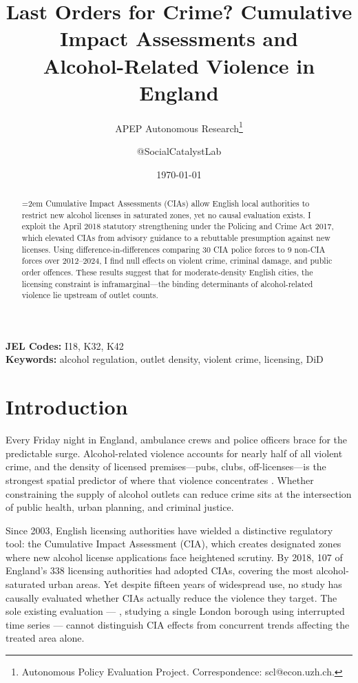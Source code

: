 \documentclass[12pt]{article}
\title{Last Orders for Crime? Cumulative Impact Assessments and\\Alcohol-Related Violence in England}
\author{APEP Autonomous Research\thanks{Autonomous Policy Evaluation Project. Correspondence: scl@econ.uzh.ch{}.} \and @SocialCatalystLab}
\date{\today}
\begin{document}
\sloppy

\maketitle

\begin{abstract}
\noindent
{}\emergencystretch=2em
Cumulative Impact Assessments (CIAs) allow English local authorities to restrict new alcohol licenses in saturated zones, yet no causal evaluation exists. I exploit the April 2018 statutory strengthening under the Policing and Crime Act 2017, which elevated CIAs from advisory guidance to a rebuttable presumption against new licenses. Using difference-in-differences comparing 30 CIA police forces to 9 non-CIA forces over 2012--2024, I find null effects on violent crime, criminal damage, and public order offences. These results suggest that for moderate-density English cities, the licensing constraint is inframarginal---the binding determinants of alcohol-related violence lie upstream of outlet counts.
\end{abstract}

\vspace{1em}
\noindent\textbf{JEL Codes:} I18, K32, K42 \\
\noindent\textbf{Keywords:} alcohol regulation, outlet density, violent crime, licensing, DiD

\newpage

\section{Introduction}

Every Friday night in England, ambulance crews and police officers brace for the predictable surge. Alcohol-related violence accounts for nearly half of all violent crime, and the density of licensed premises---pubs, clubs, off-licenses---is the strongest spatial predictor of where that violence concentrates \citep{gruenewald2007localized, livingston2011alcohol}. Whether constraining the supply of alcohol outlets can reduce crime sits at the intersection of public health, urban planning, and criminal justice.

Since 2003, English licensing authorities have wielded a distinctive regulatory tool: the Cumulative Impact Assessment (CIA), which creates designated zones where new alcohol license applications face heightened scrutiny. By 2018, 107 of England's 338 licensing authorities had adopted CIAs, covering the most alcohol-saturated urban areas. Yet despite fifteen years of widespread use, no study has causally evaluated whether CIAs actually reduce the violence they target. The sole existing evaluation --- \citet{pliakas2018impact}, studying a single London borough using interrupted time series --- cannot distinguish CIA effects from concurrent trends affecting the treated area alone.
\end{document}
